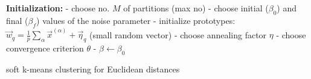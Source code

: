 \begin{algorithm}
  \DontPrintSemicolon
  \textbf{Initialization:}\;
 - choose no. $M$ of partitions (max no)\; 
- choose initial ($\beta_0$) and final ($\beta_f$) values of the noise parameter\;
- initialize prototypes:  $\vec{w}_q = \frac{1}{p} 
\sum\limits_{\alpha} \vec{x}^{(\alpha)} + \vec{\eta}_q$ (small random vector)\;
- choose annealing factor $\eta$\;
- choose convergence criterion $\theta$\;
- $\beta \leftarrow \beta_0$\;
\label{alg:softKmeansEuclidean}
\caption{soft k-means clustering for Euclidean distances}
\end{algorithm}

